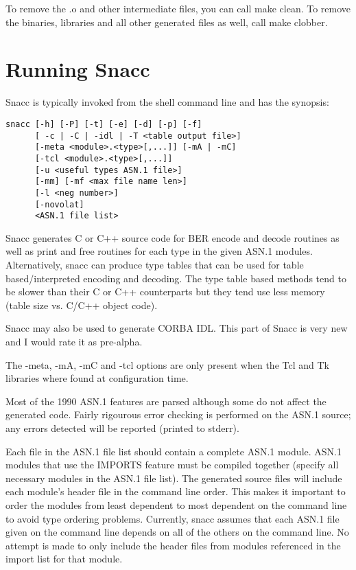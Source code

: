 To remove the {\ufn .o} and other intermediate files, you can call {\ufn make clean}.
To remove the binaries, libraries and all other generated files as well, call {\ufn make clobber}.

\section{\label{run-section}Running Snacc}

Snacc is typically invoked from the shell command line and has the synopsis:
\begin{verbatim}
snacc [-h] [-P] [-t] [-e] [-d] [-p] [-f]
      [ -c | -C | -idl | -T <table output file>]
      [-meta <module>.<type>[,...]] [-mA | -mC]
      [-tcl <module>.<type>[,...]]
      [-u <useful types ASN.1 file>]
      [-mm] [-mf <max file name len>]
      [-l <neg number>]
      [-novolat]
      <ASN.1 file list>
\end{verbatim}

Snacc generates C or C++ source code for BER encode and decode
routines as well as print and free routines for each type in the given
ASN.1 modules.  Alternatively, snacc can produce type tables that can
be used for table based/interpreted encoding and decoding.  The type
table based methods tend to be slower than their C or C++ counterparts
but they tend use less memory (table size vs. C/C++ object code).

Snacc may also be used to generate CORBA IDL\@.
This part of Snacc is very new and I would rate it as pre-alpha.

The {\ufn -meta}, {\ufn -mA}, {\ufn -mC} and {\ufn -tcl} options are only present when the Tcl and Tk libraries where found at configuration time.

Most of the 1990 ASN.1 features are parsed although some do not affect
the generated code.  Fairly rigourous error checking is performed on
the ASN.1 source; any errors detected will be reported (printed to
{\C stderr}).

Each file in the ASN.1 file list should contain a complete ASN.1
module.  ASN.1 modules that use the IMPORTS feature must be compiled
together (specify all necessary modules in the ASN.1 file list).  The
generated source files will include each module's header file in the
command line order.  This makes it important to order the modules from
least dependent to most dependent on the command line to avoid type
ordering problems. Currently, snacc assumes that each ASN.1 file
given on the command line depends on all of the others on the command
line.  No attempt is made to only include the header files from
modules referenced in the import list for that module.

